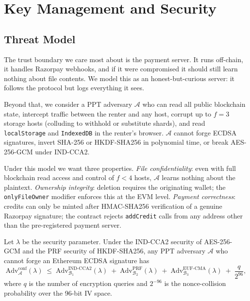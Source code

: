 \documentclass[journal]{IEEEtran}
\begin{document}
\section{Key Management and Security}
\label{sec:keywrap}

\subsection{Threat Model}

The trust boundary we care most about is the payment server.
It runs off-chain, it handles Razorpay webhooks, and if it were
compromised it should still learn nothing about file contents.
We model this as an honest-but-curious server: it follows the protocol
but logs everything it sees.

Beyond that, we consider a PPT adversary $\mathcal{A}$ who can read all
public blockchain state, intercept traffic between the renter and any host,
corrupt up to $f = 3$ storage hosts (colluding to withhold or substitute
shards), and read \texttt{localStorage} and \texttt{IndexedDB} in the
renter's browser. $\mathcal{A}$ cannot forge ECDSA signatures, invert
SHA-256 or HKDF-SHA256 in polynomial time, or break AES-256-GCM under
IND-CCA2.

Under this model we want three properties.
\textit{File confidentiality}: even with full blockchain read access and
control of $f < 4$ hosts, $\mathcal{A}$ learns nothing about the
plaintext.
\textit{Ownership integrity}: deletion requires the originating wallet;
the \texttt{onlyFileOwner} modifier enforces this at the EVM level.
\textit{Payment correctness}: credits can only be minted after
HMAC-SHA256 verification of a genuine Razorpay signature; the contract
rejects \texttt{addCredit} calls from any address other than the
pre-registered payment server.

\begin{theorem}
Let $\lambda$ be the security parameter. Under the IND-CCA2 security of
AES-256-GCM and the PRF security of HKDF-SHA256, any PPT adversary
$\mathcal{A}$ who cannot forge an Ethereum ECDSA signature has
\[
  \mathrm{Adv}^{\mathrm{conf}}_{\mathcal{A}}(\lambda)
  \;\leq\;
  \mathrm{Adv}^{\mathrm{IND\text{-}CCA2}}_{\mathcal{B}_1}(\lambda)
  \;+\;
  \mathrm{Adv}^{\mathrm{PRF}}_{\mathcal{B}_2}(\lambda)
  \;+\;
  \mathrm{Adv}^{\mathrm{EUF\text{-}CMA}}_{\mathcal{B}_3}(\lambda)
  \;+\;
  \frac{q}{2^{96}},
\]
where $q$ is the number of encryption queries and $2^{-96}$ is the
nonce-collision probability over the 96-bit IV space.
\end{theorem}
\end{document}
